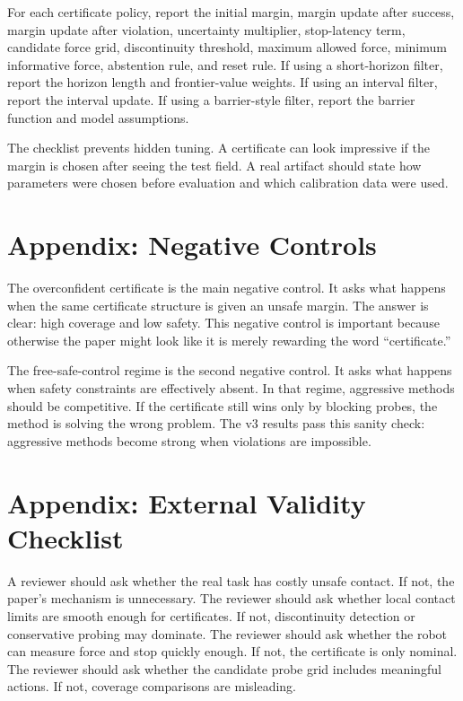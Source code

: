 \documentclass{article}
\begin{document}
For each certificate policy, report the initial margin, margin update after
success, margin update after violation, uncertainty multiplier, stop-latency
term, candidate force grid, discontinuity threshold, maximum allowed force,
minimum informative force, abstention rule, and reset rule. If using a
short-horizon filter, report the horizon length and frontier-value weights. If
using an interval filter, report the interval update. If using a barrier-style
filter, report the barrier function and model assumptions.

The checklist prevents hidden tuning. A certificate can look impressive if the
margin is chosen after seeing the test field. A real artifact should state how
parameters were chosen before evaluation and which calibration data were used.

\section{Appendix: Negative Controls}

The overconfident certificate is the main negative control. It asks what
happens when the same certificate structure is given an unsafe margin. The
answer is clear: high coverage and low safety. This negative control is
important because otherwise the paper might look like it is merely rewarding
the word ``certificate.''

The free-safe-control regime is the second negative control. It asks what
happens when safety constraints are effectively absent. In that regime,
aggressive methods should be competitive. If the certificate still wins only
by blocking probes, the method is solving the wrong problem. The v3 results
pass this sanity check: aggressive methods become strong when violations are
impossible.

\section{Appendix: External Validity Checklist}

A reviewer should ask whether the real task has costly unsafe contact. If not,
the paper's mechanism is unnecessary. The reviewer should ask whether local
contact limits are smooth enough for certificates. If not, discontinuity
detection or conservative probing may dominate. The reviewer should ask
whether the robot can measure force and stop quickly enough. If not, the
certificate is only nominal. The reviewer should ask whether the candidate
probe grid includes meaningful actions. If not, coverage comparisons are
misleading.
\end{document}
